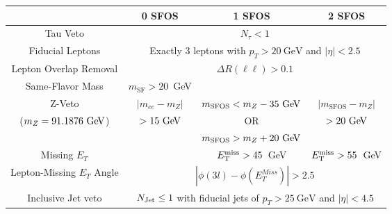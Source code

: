 \begin{tabular}{|c||c||c||c|}
\hline
&  0 SFOS  	& 1 SFOS		  & 2 SFOS  \\
\hline 
\hline 
Tau Veto & \multicolumn{3}{c|}{$N_{\tau} < 1$} \\
\hline 
Fiducial Leptons & \multicolumn{3}{c|}{Exactly 3 leptons with $p_{T} > 20~\mathrm{GeV}$ and $|\eta|<2.5$} \\
\hline 
Lepton Overlap Removal & \multicolumn{3}{c|}{$\Delta R(\ell \ell) > 0.1$}\\
\hline 
Same-Flavor Mass &	$m_{\textrm{SF}} > 20$~GeV	& \multicolumn{2}{c|}{} \\
\hline 
Z-Veto                &  $|m_{ee}-m_Z|$ & $m_{\textrm{SFOS}} < m_{Z}-35\GeV$ & $|m_{\textrm{SFOS}}-m_Z|$ \\
($m_Z = 91.1876\GeV$)  &  $>15\GeV$                                         & OR   &  $>20\GeV$\\
                      & 					  & $m_{\textrm{SFOS}}>m_{Z}+20\GeV$	   &  \\
\hline 
Missing $E_{T}$		& 		& $E_{\mathrm{T}}^{\mathrm{miss}} > 45$~GeV & $E_{\mathrm{T}}^{\mathrm{miss}} > 55$~GeV \\
\hline 
Lepton-Missing $E_{T}$ Angle 	& 	\multicolumn{3}{c|}{$|\phi(3l)-\phi(E_{T}^{Miss})| > 2.5$} \\
\hline 
Inclusive Jet veto	& \multicolumn{3}{c|}{$N_{\textrm{Jet}} \leq 1$ with fiducial jets of $p_{T} > 25~\mathrm{GeV}$ and $|\eta| < 4.5$ } \\
\hline 
\end{tabular}
